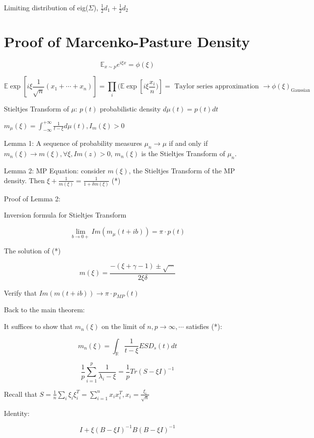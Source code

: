 \documentclass[12pt]{article}
\theoremstyle{plain}
\begin{document}
Limiting distribution of eig($\Sigma$), $\frac{1}{2}d_1 + \frac{1}{2} d_2$

\section*{Proof of Marcenko-Pasture Density}

$$ \mathbb{E}_{x \sim p} e^{i \xi x} = \phi(\xi) $$

$$ \mathbb{E} \exp[i \xi \frac{1}{\sqrt{n}} (x_1 + \cdots + x_n)] = \prod_i ( \mathbb{E} \exp[i \xi \frac{x_i}{n})] = \text{ Taylor series approximation } \rightarrow \phi(\xi)_{\text{Gaussian}} $$

Stieltjes Transform of $\mu$: $p(t)$ probabilistic density $d \mu(t) = p(t) dt$

$m_\mu(\xi) = \int_{-\infty}^{+\infty} \frac{1}{t-\xi} d \mu(t), I_m(\xi) > 0$

Lemma 1: A sequence of probability measures $\mu_n \rightarrow \mu$ if and only if $m_n(\xi) \rightarrow m(\xi), \forall \xi, Im(z) > 0$, $m_n(\xi)$ is the Stieltjes Transform of $\mu_n$.

Lemma 2: MP Equation: consider $m(\xi)$, the Stieltjes Transform of the MP density. Then $ \xi + \frac{1}{m(\xi)} = \frac{1}{1+\delta m(\xi)}$ (*)

Proof of Lemma 2:

Inversion formula for Stieltjes Transform

$$ \lim_{b \rightarrow 0+} Im ( m_\mu (t + ib)) = \pi \cdot p(t) $$

The solution of (*)

$$ m(\xi) = \frac{-(\xi + \gamma -1) \pm \sqrt{ \cdots}}{2 \xi \delta} $$

Verify that $Im(m(t+ib)) \rightarrow \pi \cdot p_{MP}(t)$

Back to the main theorem:

It suffices to show that $m_n (\xi)$ on the limit of $n, p \rightarrow \infty, \cdots$ satisfies (*):


$$ m_n(\xi) = \int_\mathbb{R} \frac{1}{t-\xi}  ESD_{s}(t) dt $$

$$ \frac{1}{p} \sum_{i=1}^p \frac{1}{\lambda_i - \xi} = \frac{1}{p} Tr(S - \xi I)^{-1} $$

Recall that $S = \frac{1}{n} \sum_{i} \xi_i \xi_i^T = \sum_{i=1}^n x_i x_i^T, x_i = \frac{\xi_i}{\sqrt{n}}$

Identity:

$$ I + \xi(B-\xi I)^{-1} B(B- \xi I)^{-1} $$
\end{document}
